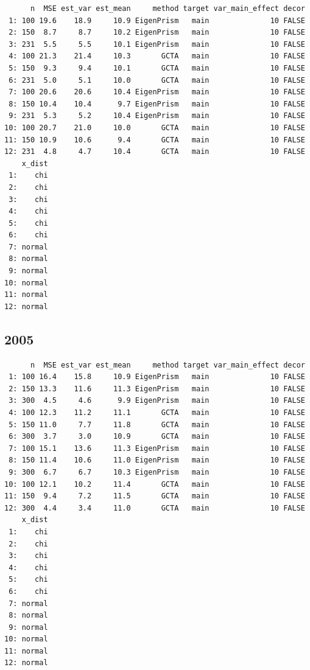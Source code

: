 \documentclass[]{article}
\begin{document}
\begin{verbatim}
      n  MSE est_var est_mean     method target var_main_effect decor
 1: 100 19.6    18.9     10.9 EigenPrism   main              10 FALSE
 2: 150  8.7     8.7     10.2 EigenPrism   main              10 FALSE
 3: 231  5.5     5.5     10.1 EigenPrism   main              10 FALSE
 4: 100 21.3    21.4     10.3       GCTA   main              10 FALSE
 5: 150  9.3     9.4     10.1       GCTA   main              10 FALSE
 6: 231  5.0     5.1     10.0       GCTA   main              10 FALSE
 7: 100 20.6    20.6     10.4 EigenPrism   main              10 FALSE
 8: 150 10.4    10.4      9.7 EigenPrism   main              10 FALSE
 9: 231  5.3     5.2     10.4 EigenPrism   main              10 FALSE
10: 100 20.7    21.0     10.0       GCTA   main              10 FALSE
11: 150 10.9    10.6      9.4       GCTA   main              10 FALSE
12: 231  4.8     4.7     10.4       GCTA   main              10 FALSE
    x_dist
 1:    chi
 2:    chi
 3:    chi
 4:    chi
 5:    chi
 6:    chi
 7: normal
 8: normal
 9: normal
10: normal
11: normal
12: normal
\end{verbatim}

\subsection{2005}\label{section-1}

\begin{verbatim}
      n  MSE est_var est_mean     method target var_main_effect decor
 1: 100 16.4    15.8     10.9 EigenPrism   main              10 FALSE
 2: 150 13.3    11.6     11.3 EigenPrism   main              10 FALSE
 3: 300  4.5     4.6      9.9 EigenPrism   main              10 FALSE
 4: 100 12.3    11.2     11.1       GCTA   main              10 FALSE
 5: 150 11.0     7.7     11.8       GCTA   main              10 FALSE
 6: 300  3.7     3.0     10.9       GCTA   main              10 FALSE
 7: 100 15.1    13.6     11.3 EigenPrism   main              10 FALSE
 8: 150 11.4    10.6     11.0 EigenPrism   main              10 FALSE
 9: 300  6.7     6.7     10.3 EigenPrism   main              10 FALSE
10: 100 12.1    10.2     11.4       GCTA   main              10 FALSE
11: 150  9.4     7.2     11.5       GCTA   main              10 FALSE
12: 300  4.4     3.4     11.0       GCTA   main              10 FALSE
    x_dist
 1:    chi
 2:    chi
 3:    chi
 4:    chi
 5:    chi
 6:    chi
 7: normal
 8: normal
 9: normal
10: normal
11: normal
12: normal
\end{verbatim}
\end{document}
